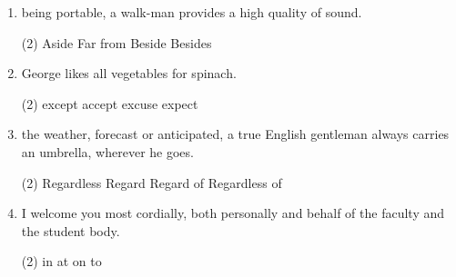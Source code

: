\begin{enumerate}
\item \ttu being portable, a walk-man provides a high quality of sound.
  \begin{tasks}(2)
    \task Aside
    \task Far from
    \task Beside
    \task Besides
  \end{tasks}

\item George likes all vegetables \ttu for spinach.
  \begin{tasks}(2)
    \task except
    \task accept
    \task excuse
    \task expect
  \end{tasks}

\item \ttu the weather, forecast or anticipated, a true English gentleman always carries an umbrella, wherever he goes.
  \begin{tasks}(2)
    \task Regardless
    \task Regard
    \task Regard of
    \task Regardless of
  \end{tasks}

\item I welcome you most cordially, both personally and \ttu behalf of the faculty and the student body.
  \begin{tasks}(2)
    \task in
    \task at
    \task on
    \task to
  \end{tasks}
\end{enumerate}

